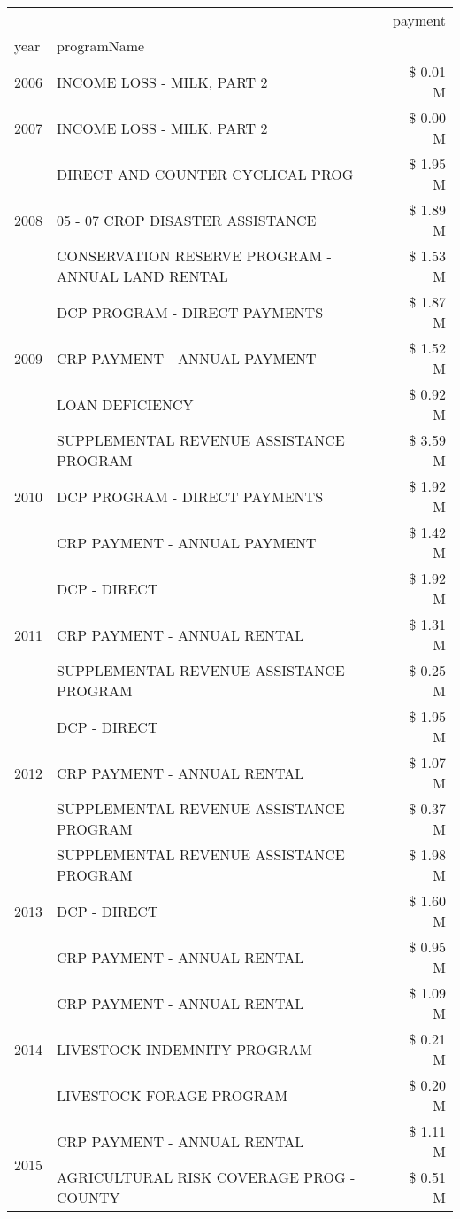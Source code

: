 \begin{tabular}{llr}
\toprule
 &  & payment \\
year & programName &  \\
\midrule
2006 & INCOME LOSS - MILK, PART 2 & \$ 0.01 M \\
\cline{1-3}
2007 & INCOME LOSS - MILK, PART 2 & \$ 0.00 M \\
\cline{1-3}
\multirow[t]{3}{*}{2008} & DIRECT AND COUNTER CYCLICAL PROG & \$ 1.95 M \\
 & 05 - 07 CROP DISASTER ASSISTANCE & \$ 1.89 M \\
 & CONSERVATION RESERVE PROGRAM - ANNUAL LAND RENTAL & \$ 1.53 M \\
\cline{1-3}
\multirow[t]{3}{*}{2009} & DCP PROGRAM - DIRECT PAYMENTS & \$ 1.87 M \\
 & CRP PAYMENT - ANNUAL PAYMENT & \$ 1.52 M \\
 & LOAN DEFICIENCY & \$ 0.92 M \\
\cline{1-3}
\multirow[t]{3}{*}{2010} & SUPPLEMENTAL REVENUE ASSISTANCE PROGRAM & \$ 3.59 M \\
 & DCP PROGRAM - DIRECT PAYMENTS & \$ 1.92 M \\
 & CRP PAYMENT - ANNUAL PAYMENT & \$ 1.42 M \\
\cline{1-3}
\multirow[t]{3}{*}{2011} & DCP - DIRECT & \$ 1.92 M \\
 & CRP PAYMENT - ANNUAL RENTAL & \$ 1.31 M \\
 & SUPPLEMENTAL REVENUE ASSISTANCE PROGRAM & \$ 0.25 M \\
\cline{1-3}
\multirow[t]{3}{*}{2012} & DCP - DIRECT & \$ 1.95 M \\
 & CRP PAYMENT - ANNUAL RENTAL & \$ 1.07 M \\
 & SUPPLEMENTAL REVENUE ASSISTANCE PROGRAM & \$ 0.37 M \\
\cline{1-3}
\multirow[t]{3}{*}{2013} & SUPPLEMENTAL REVENUE ASSISTANCE PROGRAM & \$ 1.98 M \\
 & DCP - DIRECT & \$ 1.60 M \\
 & CRP PAYMENT - ANNUAL RENTAL & \$ 0.95 M \\
\cline{1-3}
\multirow[t]{3}{*}{2014} & CRP PAYMENT - ANNUAL RENTAL & \$ 1.09 M \\
 & LIVESTOCK INDEMNITY PROGRAM & \$ 0.21 M \\
 & LIVESTOCK FORAGE PROGRAM & \$ 0.20 M \\
\cline{1-3}
\multirow[t]{3}{*}{2015} & CRP PAYMENT - ANNUAL RENTAL & \$ 1.11 M \\
 & AGRICULTURAL RISK COVERAGE PROG - COUNTY & \$ 0.51 M \\

\end{tabular}

